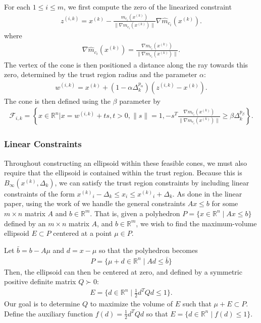 \documentclass{article}
\theoremstyle{case}
\newcommand{\xk}{{x^{(k)}}}
\newcommand{\Rn}{\mathbb R^n}
\newcommand{\Rm}{\mathbb R^m}
\newcommand{\dk}{\Delta_k}
\newcommand{\zik}{{z^{(i, k)}}}
\newcommand{\fik}{{\mathcal F_{i, k}}}
\newcommand{\rn}{{\mathbb R^{n}}}
\newcommand{\wik}{{w^{(i, k)}}}
\newcommand{\gmcik}{{\nabla m_{c_i}(\xk)}}
\newcommand{\hgik}{{\frac{\nabla m_{c_i}(\xk)}{\|\nabla m_{c_i}(\xk)\|}}}
\newcommand{\hgmcik}{{\nabla \hat m_{c_i}(\xk)}}
\newcommand{\tr}{{ B_{\infty}\left(\xk, \dk\right) }}
\begin{document}
For each $1\le i\le m$, we first compute the zero of the linearized constraint
\begin{align}
\zik = \xk - \frac{m_{c_i}(\xk)}{\|\gmcik\|} \hgmcik. \label{def_z}
\end{align}
where
\begin{align}
\hgmcik = \frac{\nabla m_{c_i}(\xk)}{\|\nabla m_{c_i}(\xk)\|}. \label{def_normalized_gradient}
\end{align}
The vertex of the cone is then positioned a distance along the ray towards this zero, determined by the trust region radius and the parameter $\alpha$:
\begin{align}
\wik = \xk + \left(1 - \alpha\dk^{p_{\alpha}}\right)\left(\zik - \xk\right). \label{def_w}
\end{align}
The cone is then defined using the $\beta$ parameter by
\begin{align}
\fik = \left\{x \in \rn | x = \wik + t s,t > 0, \|s\| = 1, -s^T\hgik \ge \beta \dk^{p_{\beta}} \right\}. \label{def_f}
\end{align}




\subsubsection{Linear Constraints}

Throughout constructing an ellipsoid within these feasible cones, we must also require that the ellipsoid is contained within the trust region.
Because this is $\tr$, we can satisfy the trust region constraints by including linear constraints of the form $\xk_i - \dk \le x_i \le \xk_i + \dk$.
As done in the linear paper, using the work of \cite{Khachiyan1993} we handle the general constraints $Ax \le b$ for some $m\times n$ matrix $A$ and $b \in \Rm$.
That is, given a polyhedron $P = \{ x \in \Rn\; | \;  Ax \le b \}$ defined by an $m \times n$ matrix $A$, and $b \in \Rm$,
we wish to find the maximum-volume ellipsoid $E \subset P$ centered at a point $\mu \in P$.

Let $\bar{b} = b - A\mu$ and $d = x - \mu$ so that the polyhedron becomes
\begin{align*}
P = \{ \mu + d \in \Rn \; | \;  Ad \le \bar{b} \}
\end{align*}
Then, the ellipsoid can then be centered at zero, and defined by a symmetric positive definite matrix $Q \succ 0$:
\begin{align*}
E = \{ d \in \Rn \; | \; \frac 1 2 d^T Q d \le 1 \}.
\end{align*}
Our goal is to determine $Q$ to maximize the volume of $E$ such that $\mu + E \subset P$.
Define the auxiliary function $f(d) = \frac 1 2 d^T Q d$ so that $E = \{ d \in \Rn\; | \; f(d) \le 1 \}$.
\end{document}
